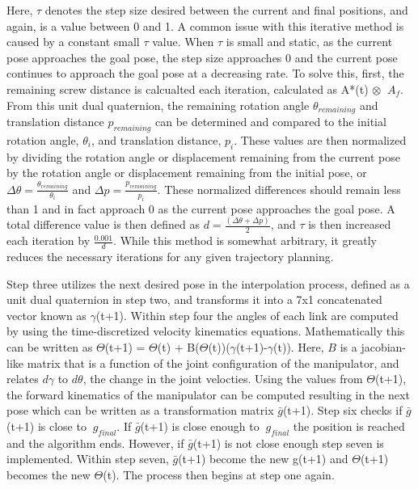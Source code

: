 \documentclass[11pt]{article}
\begin{document}
Here, $\tau$ denotes the step size desired between the current and final positions, and again, is a value between 0 and 1. A common issue with this iterative method is caused by a constant small $\tau$ value. When $\tau$ is small and static, as the current pose approaches the goal pose, the step size approaches 0 and the current pose continues to approach the goal pose at a decreasing rate. To solve this, first, the remaining screw distance is calcualted each iteration, calculated as A*(t) $\otimes$ $\ A_f$. From this unit dual quaternion, the remaining rotation angle $\theta_{remaining}$ and translation distance $p_{remaining}$ can be determined and compared to the initial rotation angle, $\theta_i$, and translation distance,  $p_i$. These values are then normalized by dividing the rotation angle or displacement remaining from the current pose by the rotation angle or displacement remaining from the initial pose, or $\Delta \theta = \frac{\theta_{remaining}}{\theta_i}$ and $\Delta p = \frac{p_{remaining}}{p_i}$. These normalized differences should remain less than 1 and in fact approach 0 as the current pose approaches the goal pose. A total difference value is then defined as $d = \frac{(\Delta \theta + \Delta p)}{2}$, and $\tau$ is then increased each iteration by $\frac{0.001}{d}$. While this method is somewhat arbitrary, it greatly reduces the necessary iterations for any given trajectory planning.
\newline

Step three utilizes the next desired pose in the interpolation process, defined as a unit dual quaternion in step two, and transforms it into a 7x1 concatenated vector known as $\gamma$(t+1). Within step four the angles of each link are computed by using the time-discretized velocity kinematics equations. Mathematically this can be written as $\Theta$(t+1) = $\Theta$(t) + B($\Theta$(t))($\gamma$(t+1)-$\gamma$(t)). Here, $B$ is a jacobian-like matrix that is a function of the joint configuration of the manipulator, and relates $d \gamma$ to $d \theta$, the change in the joint velocties. Using the values from $\Theta$(t+1), the forward kinematics of the manipulator can be computed resulting in the next pose which can be written as a transformation matrix $\bar{g}$(t+1). Step six checks if $\bar{g}$(t+1) is close to $\ g_{final}$. If $\bar{g}$(t+1) is close enough to  $ \ g_{final}$ the position is reached and the algorithm ends. However, if  $\bar{g}$(t+1) is not close enough step seven is implemented. Within step seven, $\bar{g}$(t+1) become the new g(t+1) and $\Theta$(t+1) becomes the new $\Theta$(t). The process then begins at step one again.
\newline
\end{document}
